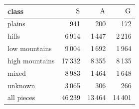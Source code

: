 \begin{tabular}{@{}l r r r@{}}
\toprule
class & $\mathrm{S}$ & $\mathrm{A}$ & $\mathrm{G}$ \\
\midrule
plains & 941 & 200 & 172 \\
hills & 6\,914 & 1\,447 & 2\,216 \\
low mountains & 9\,004 & 1\,692 & 1\,964 \\
high mountains & 17\,332 & 8\,355 & 8\,135 \\
mixed & 8\,983 & 1\,464 & 1\,648 \\
unknown & 3\,065 & 306 & 266 \\
all pieces & 46\,239 & 13\,464 & 14\,401 \\
\bottomrule
\end{tabular}
